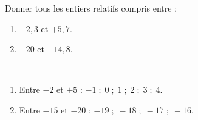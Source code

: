 \begin{exercice*}
    Donner tous les entiers relatifs compris entre :
    \begin{enumerate}
       \item $-2,3$ et $+5,7$.
       \item $-20$ et $-14,8$.
    \end{enumerate}
 \end{exercice*}
 
 \begin{corrige}
    \ \\ [-5mm]
    \begin{enumerate}
       \item Entre $-2$ et $+5$ : {\red$-1 \; ; \; 0 \; ; \; 1 \; ; \; 2 \; ; \; 3 \; ; \; 4$}. \smallskip
       \item Entre $-15$ et $-20$ : {\red $-19 \; ; \; -18 \; ; \; -17 \; ; \; -16$}. \smallskip
    \end{enumerate}
 \end{corrige}